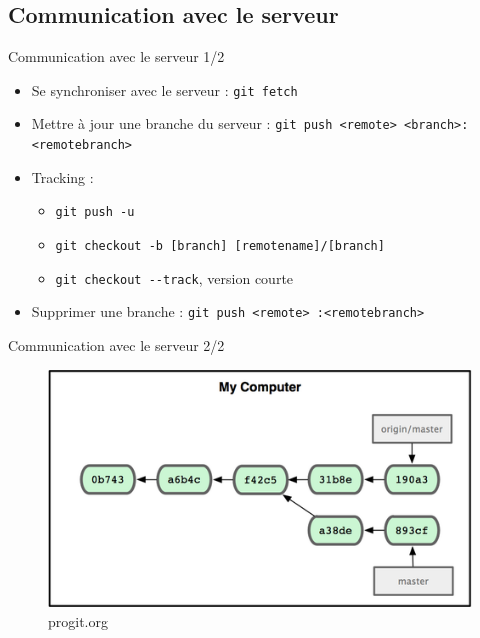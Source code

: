 \documentclass{beamer}
\begin{document}
\subsection*{Communication avec le serveur}
\begin{frame}{Communication avec le serveur 1/2}
  \begin{itemize}
  \item Se synchroniser avec le serveur : \lstinline|git fetch|
  \item Mettre à jour une branche du serveur : 
    \lstinline|git push <remote> <branch>:<remotebranch>|
  \item Tracking : 
    \begin{itemize} 
    \item[] \lstinline|git push -u| 
    \item[] \lstinline|git checkout -b [branch] [remotename]/[branch]|
    \item[] \lstinline|git checkout --track|, version courte
    \end{itemize}
  \item Supprimer une branche :
    \lstinline|git push <remote> :<remotebranch>|
  \end{itemize}
\end{frame}

\begin{frame}{Communication avec le serveur 2/2}
  \begin{figure}
    \begin{center}
      \includegraphics[scale=1]{img/RemoteBranch.png}
    \end{center}
    \caption{progit.org}
  \end{figure}
\end{frame}
\end{document}
